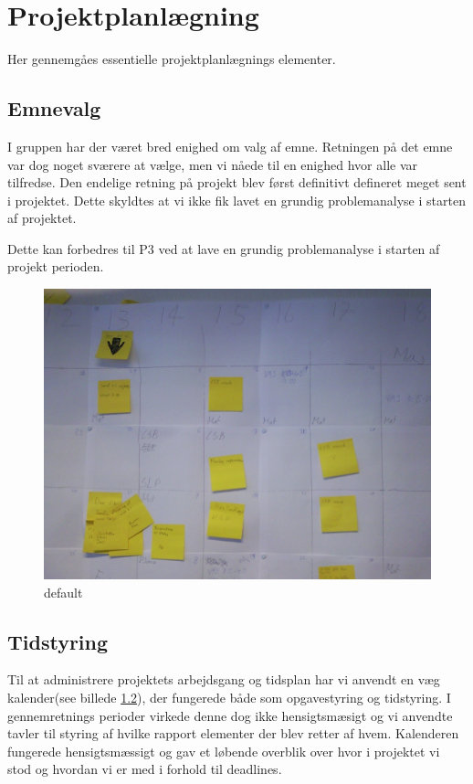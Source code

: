 \section{Projektplanl\ae{}gning}
Her gennemg\aa{}es essentielle projektplanl\ae{}gnings elementer. 

\subsection{Emnevalg}
I gruppen har der v\ae{}ret bred enighed om valg af emne. Retningen p\aa{} det emne var dog noget sv\ae{}rere at v\ae{}lge, men vi n\aa{}ede til en enighed hvor alle var tilfredse. 
Den endelige retning p\aa{} projekt blev f\o{}rst definitivt defineret meget sent i projektet.
Dette skyldtes at vi ikke fik lavet en grundig problemanalyse i starten af projektet.

Dette kan forbedres til P3 ved at lave en grundig problemanalyse i starten af projekt perioden. 

\begin{figure}[htbp]
\begin{center}
\includegraphics[width=\textwidth]{Billede0075.jpg}
\caption{default}
\label{default}
\end{center}
\end{figure}


\subsection{Tidstyring}
Til at administrere projektets arbejdsgang og tidsplan har vi anvendt en v\ae{}g kalender(see billede \ref{}), der fungerede b\aa{}de som opgavestyring og tidstyring. 
I gennemretnings perioder virkede denne dog ikke hensigtsm\ae{}sigt og vi anvendte tavler til styring af hvilke rapport elementer der blev retter af hvem. 
Kalenderen fungerede hensigtsm\ae{}ssigt og gav et l\o{}bende overblik over hvor i projektet vi stod og hvordan vi er med i forhold til deadlines. 

